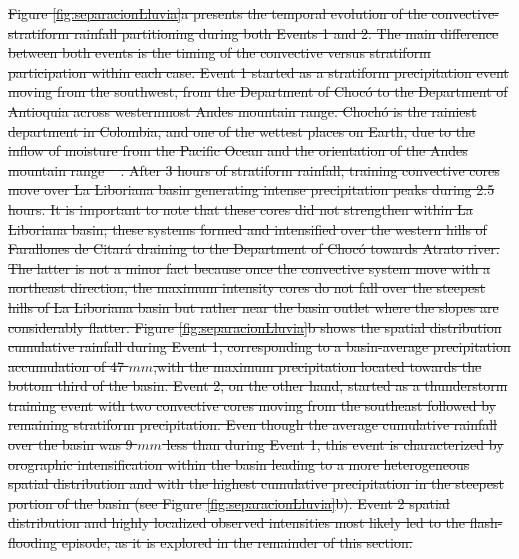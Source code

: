 \documentclass[hess, manuscript]{copernicus} %
\providecommand{\DIFdel}[1]{{\protect\color{red}\sout{#1}}}                      %
\providecommand{\DIFdelbegin}{} %
\begin{document}
\DIFdelbegin \DIFdel{Figure \ref{fig:separacionLluvia}a presents the temporal evolution of the convective-stratiform rainfall partitioning during both Events 1 and 2.  The main difference between both events is the timing of the convective versus stratiform participation within each case. Event 1 started as a stratiform precipitation event moving from the southwest, from the Department of Chocó to the Department of Antioquia across westernmost Andes mountain range. Chochó is the rainiest department in Colombia, and one of the wettest places on Earth, due to the inflow of moisture from the Pacific Ocean and the orientation of the Andes mountain range \mbox{%
\citep{poveda2000, Mapes2003}}\hspace{0pt}%
.  After 3 hours of stratiform rainfall, training convective cores move over La Liboriana basin generating intense precipitation peaks during 2.5 hours. It is important to note that these cores did not strengthen within La Liboriana basin; these systems formed and intensified over the western hills of Farallones de Citará draining to the Department of Chocó towards Atrato river. The latter is not a minor fact because once the convective system move with a northeast direction, the maximum intensity cores do not fall over the steepest hills of La Liboriana basin but rather near the basin outlet where the slopes are considerably flatter. Figure \ref{fig:separacionLluvia}b shows the spatial distribution cumulative rainfall during Event 1, corresponding to a basin-average precipitation accumulation of 47 $mm$,with the maximum precipitation located towards the bottom third of the basin. Event 2, on the other hand, started as a thunderstorm training event with two convective cores moving from the southeast followed by remaining stratiform precipitation.  Even though the average cumulative rainfall over the basin was 9 $mm$ less than during Event 1, this event is characterized by orographic intensification within the basin leading to a more heterogeneous spatial distribution and with the highest cumulative precipitation in the steepest portion of the basin (see Figure \ref{fig:separacionLluvia}b). Event 2 spatial distribution and highly localized observed intensities most likely led to the flash-flooding episode, as it is explored in the remainder of this section. }%
\end{document}
